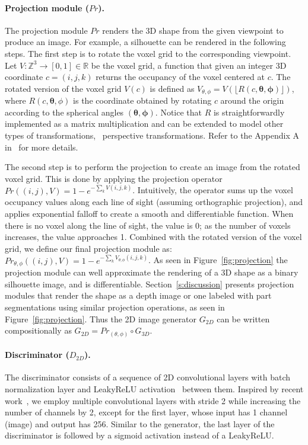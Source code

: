 \paragraph{Projection module ($Pr$).}
The projection module $Pr$ renders the 3D shape from the given
viewpoint to produce an image. 
For example, a silhouette can be
rendered in the following steps.
The first step is to rotate the voxel grid to the corresponding viewpoint.
Let $V : \mathbb{Z}^3 \rightarrow [0,1] \in \mathbb{R}$ be the voxel grid, a function that
given an integer 3D coordinate $c=(i,j,k)$ returns the occupancy of the voxel centered at $c$.
The rotated version of the voxel grid $V(c)$ is defined as 
$V_{\mathbb{\theta, \phi}} = V(\lfloor{R(c, \mathbf{\theta,\phi})}\rfloor)$,
where $R(c, \mathbf{\theta},\phi)$ is the coordinate obtained by rotating $c$ around the origin
according to the spherical angles $\mathbf{(\theta,\phi)}$. 
Notice that $R$ is straightforwardly implemented as a matrix multiplication and can be
extended to model other types of transformations, \eg~perspective transformations.
Refer to the Appendix A in~\cite{yan2016perspective} for more details.

The second step is to perform the projection to create an image from
the rotated voxel grid.
This is done by applying the projection operator 
$Pr((i,j),V) = 1 - e^{-\sum_{k}V(i,j,k)}$. 
Intuitively, the operator sums up the voxel occupancy values along
each line of sight (assuming orthographic projection), and applies
exponential falloff to create a smooth and differentiable
function.
When there is no voxel along the line of sight, the value is
0; as the number of voxels increases, the value approaches 1.
Combined with the rotated version of the voxel grid, we define our
final projection module as:
$Pr_{\theta,\phi}((i,j),V) = 1 - e^{-\sum_{k}V_{\theta,\phi}(i,j,k)}$. 
As seen in Figure~\ref{fig:projection} the projection module can well
approximate the rendering of a 3D shape as a binary silhouette image,
and is differentiable.
Section~\ref{s:discussion} presents projection modules that
render the shape as a depth image or one labeled with part segmentations
using similar projection operations, as seen in Figure~\ref{fig:projection}. 
Thus the 2D image generator $G_{2D}$ can be written compositionally as
${G}_{2D} = {Pr}_{(\theta, \phi)} \circ G_{3D}$.



\paragraph{Discriminator ($D_{2D}$).}
The discriminator consists of a sequence of 2D convolutional layers with
batch normalization layer and LeakyReLU activation~\cite{maas2013rectifier} between them. 
Inspired by recent work~\cite{radford2015unsupervised,wu2016learning}, we employ
multiple convolutional layers with stride 2 while increasing the
number of channels by 2, except for the first layer,
whose input has 1 channel (image) and output has 256.
Similar to the generator, the last layer of the discriminator is
followed by a sigmoid activation instead of a LeakyReLU.


